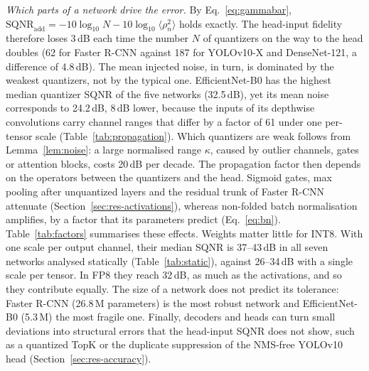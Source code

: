 \documentclass[pdflatex,sn-mathphys-num]{sn-jnl}%
\theoremstyle{thmstyleone}%
\theoremstyle{thmstyletwo}%
\theoremstyle{thmstylethree}%
\begin{document}
\emph{Which parts of a network drive the error.} By Eq.~\eqref{eq:gammabar}, $\mathrm{SQNR}_\text{add}=-10\log_{10}N-10\log_{10}\langle\rho_n^2\rangle$ holds exactly. The head-input fidelity therefore loses 3\,dB each time the number $N$ of quantizers on the way to the head doubles (62 for Faster R-CNN against 187 for YOLOv10-X and DenseNet-121, a difference of 4.8\,dB). The mean injected noise, in turn, is dominated by the weakest quantizers, not by the typical one. EfficientNet-B0 has the highest median quantizer SQNR of the five networks (32.5\,dB), yet its mean noise corresponds to 24.2\,dB, 8\,dB lower, because the inputs of its depthwise convolutions carry channel ranges that differ by a factor of 61 under one per-tensor scale (Table~\ref{tab:propagation}). Which quantizers are weak follows from Lemma~\ref{lem:noise}: a large normalised range $\kappa$, caused by outlier channels, gates or attention blocks, costs 20\,dB per decade. The propagation factor then depends on the operators between the quantizers and the head. Sigmoid gates, max pooling after unquantized layers and the residual trunk of Faster R-CNN attenuate (Section~\ref{sec:res-activations}), whereas non-folded batch normalisation amplifies, by a factor that its parameters predict (Eq.~\eqref{eq:bn}). Table~\ref{tab:factors} summarises these effects. Weights matter little for INT8. With one scale per output channel, their median SQNR is 37--43\,dB in all seven networks analysed statically (Table~\ref{tab:static}), against 26--34\,dB with a single scale per tensor. In FP8 they reach 32\,dB, as much as the activations, and so they contribute equally. The size of a network does not predict its tolerance: Faster R-CNN (26.8\,M parameters) is the most robust network and EfficientNet-B0 (5.3\,M) the most fragile one. Finally, decoders and heads can turn small deviations into structural errors that the head-input SQNR does not show, such as a quantized TopK or the duplicate suppression of the NMS-free YOLOv10 head (Section~\ref{sec:res-accuracy}).
\end{document}
